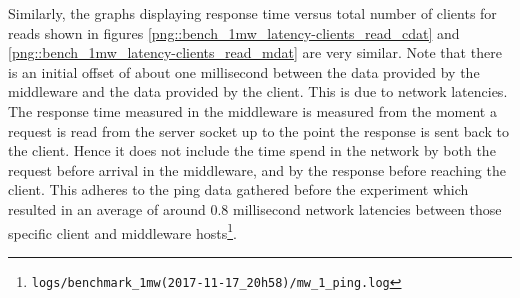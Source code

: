 \documentclass[11pt,a4paper]{article}
\begin{document}
Similarly, the graphs displaying response time versus total number of clients for reads shown in figures \ref{png::bench_1mw_latency-clients_read_cdat} and \ref{png::bench_1mw_latency-clients_read_mdat} are very similar. Note that there is an initial offset of about one millisecond between the data provided by the middleware and the data provided by the client. This is due to network latencies. The response time measured in the middleware is measured from the moment a request is read from the server socket up to the point the response is sent back to the client. Hence it does not include the time spend in the network by both the request before arrival in the middleware, and by the response before reaching the client. This adheres to the ping data gathered before the experiment which resulted in an average of around 0.8 millisecond network latencies between those specific client and middleware hosts\footnote{\texttt{logs/benchmark_1mw(2017-11-17_20h58)/mw_1_ping.log}}.
\end{document}
